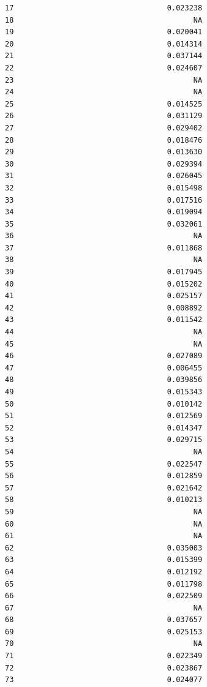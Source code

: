 \documentclass[
  letterpaper,
  DIV=11,
  numbers=noendperiod]{scrartcl}
\begin{document}
\begin{verbatim}
17                                   0.023238
18                                         NA
19                                   0.020041
20                                   0.014314
21                                   0.037144
22                                   0.024607
23                                         NA
24                                         NA
25                                   0.014525
26                                   0.031129
27                                   0.029402
28                                   0.018476
29                                   0.013630
30                                   0.029394
31                                   0.026045
32                                   0.015498
33                                   0.017516
34                                   0.019094
35                                   0.032061
36                                         NA
37                                   0.011868
38                                         NA
39                                   0.017945
40                                   0.015202
41                                   0.025157
42                                   0.008892
43                                   0.011542
44                                         NA
45                                         NA
46                                   0.027089
47                                   0.006455
48                                   0.039856
49                                   0.015343
50                                   0.010142
51                                   0.012569
52                                   0.014347
53                                   0.029715
54                                         NA
55                                   0.022547
56                                   0.012859
57                                   0.021642
58                                   0.010213
59                                         NA
60                                         NA
61                                         NA
62                                   0.035003
63                                   0.015399
64                                   0.012192
65                                   0.011798
66                                   0.022509
67                                         NA
68                                   0.037657
69                                   0.025153
70                                         NA
71                                   0.022349
72                                   0.023867
73                                   0.024077

\end{verbatim}
\end{document}
